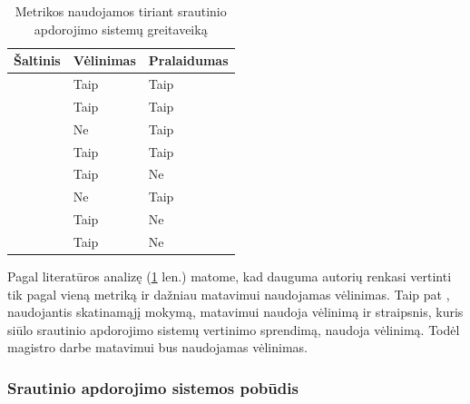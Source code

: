 \documentclass{VUMIFPSbakalaurinis}
\begin{document}
\begin{table}[H]
    \centering
    \caption{Metrikos naudojamos tiriant srautinio apdorojimo sistemų greitaveiką}
    \begin{tabular}{|l|l|l|}
    \hline
    Šaltinis                 & Vėlinimas                        & Pralaidumas                    \\ \hline
    \cite{stonebraker20058}  & Taip                             & Taip                           \\ \hline
    \cite{Karimov2018BenchmarkingDS} & Taip                     & Taip                           \\ \hline
    \cite{hirzel2014catalog} & Ne                               & Taip                           \\ \hline
    \cite{Qian2016Benchmarking} & Taip                          & Taip                           \\ \hline
    \cite{zhang2020heron}    & Taip                             & Ne                             \\ \hline
    \cite{dhalion}           & Ne                               & Taip                           \\ \hline
    \cite{vaquero2018autotuning} & Taip                         & Ne                             \\ \hline
    \cite{Chintapalli2016Benchmarking} & Taip                   & Ne                             \\ \hline
    \end{tabular}
\label{metrikos}
\end{table}

Pagal literatūros analizę (\ref{metrikos} len.) matome, kad dauguma autorių renkasi vertinti tik pagal vieną metriką ir dažniau matavimui naudojamas vėlinimas. Taip pat \cite{vaquero2018autotuning}, naudojantis skatinamąjį mokymą, matavimui naudoja vėlinimą ir \cite{Chintapalli2016Benchmarking} straipsnis, kuris siūlo srautinio apdorojimo sistemų vertinimo sprendimą, naudoja vėlinimą. Todėl magistro darbe matavimui bus naudojamas vėlinimas.   

\subsubsection{Srautinio apdorojimo sistemos pobūdis}
\end{document}
